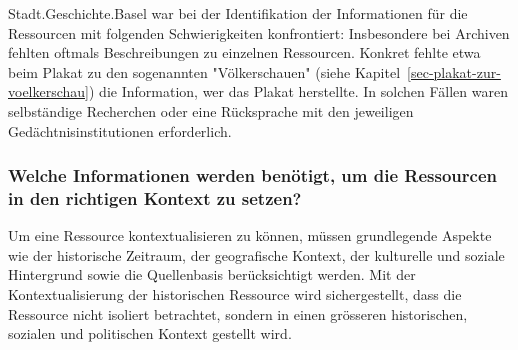 \documentclass[
  nswissgerman,
  letterpaper,
  DIV=11,
  numbers=noendperiod]{scrartcl}
\begin{document}
\begin{tcolorbox}[enhanced jigsaw, arc=.35mm, bottomrule=.15mm, bottomtitle=1mm, breakable, colback=white, colbacktitle=quarto-callout-tip-color!10!white, colframe=quarto-callout-tip-color-frame, coltitle=black, left=2mm, leftrule=.75mm, opacityback=0, opacitybacktitle=0.6, rightrule=.15mm, title=\textcolor{quarto-callout-tip-color}{\faLightbulb}\hspace{0.5em}{Erfahrungen der Stadt.Geschichte.Basel}, titlerule=0mm, toprule=.15mm, toptitle=1mm]

Stadt.Geschichte.Basel war bei der Identifikation der Informationen für
die Ressourcen mit folgenden Schwierigkeiten konfrontiert: Insbesondere
bei Archiven fehlten oftmals Beschreibungen zu einzelnen Ressourcen.
Konkret fehlte etwa beim Plakat zu den sogenannten "Völkerschauen"
(siehe Kapitel~\ref{sec-plakat-zur-voelkerschau}) die Information, wer
das Plakat herstellte. In solchen Fällen waren selbständige Recherchen
oder eine Rücksprache mit den jeweiligen Gedächtnisinstitutionen
erforderlich.

\end{tcolorbox}

\subsubsection{Welche Informationen werden benötigt, um die Ressourcen
in den richtigen Kontext zu
setzen?}\label{welche-informationen-werden-benuxf6tigt-um-die-ressourcen-in-den-richtigen-kontext-zu-setzen}

Um eine Ressource kontextualisieren zu können, müssen grundlegende
Aspekte wie der historische Zeitraum, der geografische Kontext, der
kulturelle und soziale Hintergrund sowie die Quellenbasis berücksichtigt
werden. Mit der Kontextualisierung der historischen Ressource wird
sichergestellt, dass die Ressource nicht isoliert betrachtet, sondern in
einen grösseren historischen, sozialen und politischen Kontext gestellt
wird.
\end{document}
